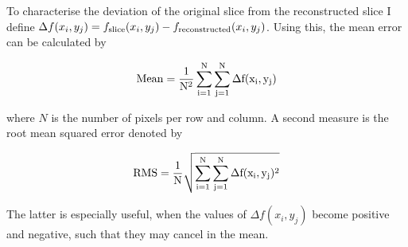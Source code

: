 \documentclass[12pt]{article}
\begin{document}
To characterise the deviation of the original slice from the reconstructed slice I define  $\Delta f(x_i,y_j)=f_{\rm slice}(x_i,y_j)-f_{\rm reconstructed}(x_i,y_j)$. Using this, the mean error can be calculated by

\begin{equation}\label{eq.mean}
	\rm{Mean} = \frac{1}{N^2}\sum\limits_{i=1}^{N} \sum \limits_{j=1}^{N}  \Delta f(x_i,y_j)
\end{equation}

where $N$ is the number of pixels per row and column. A second measure is the root mean squared error denoted by

\begin{equation}\label{eq.rms}
	\rm{RMS} =  \frac{1}{N}\sqrt{\sum\limits_{i=1}^{N} \sum \limits_{j=1}^{N}  \Delta f(x_i,y_j)^2}
\end{equation}

The latter is especially useful, when the values of $\Delta f(x_i,y_j)$ become positive and negative, such that they may cancel in the mean.
\end{document}
